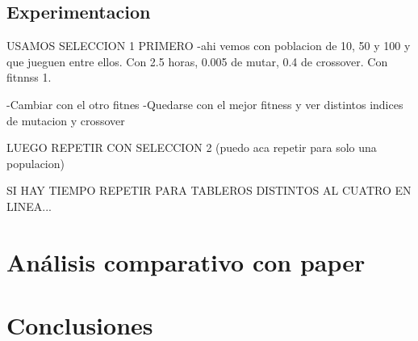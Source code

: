 \documentclass[A4paper,oneside,fleqn,11pt]{article}
\theoremstyle{definition}
\begin{document}
\subsection{Experimentacion}



USAMOS SELECCION 1 PRIMERO
-ahi vemos con poblacion de 10, 50 y 100 y que jueguen entre ellos. Con 2.5 horas, 0.005 de mutar, 0.4 de crossover. Con fitnnss 1.


-Cambiar con el otro fitnes
-Quedarse con el mejor fitness y ver distintos indices de mutacion y crossover

LUEGO REPETIR CON SELECCION 2 (puedo aca repetir para solo una populacion)

SI HAY TIEMPO REPETIR PARA TABLEROS DISTINTOS AL CUATRO EN LINEA...















\section{Análisis comparativo con paper}



\section{Conclusiones}
\end{document}
